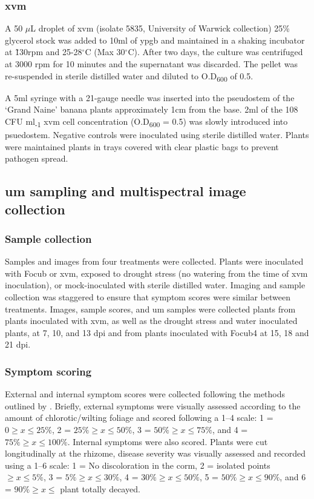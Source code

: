 \subsubsection{\acl{xvm}}
A 50 \(\mu\)L droplet of \acf{xvm} (isolate 5835, University of Warwick collection) 25\% glycerol stock was added to 10ml of \ac{ypgb} and maintained in a shaking incubator at \~ 130rpm and 25-28$^{\circ}$C (Max 30$^{\circ}$C). After two days, the culture was centrifuged at 3000 \ac{rpm} for 10 minutes and the supernatant was discarded. The pellet was re-suspended in sterile distilled water and diluted to O.D\textsubscript{600} of 0.5. 

A 5ml syringe with a 21-gauge needle was inserted into the pseudostem of the ‘Grand Naine’ banana plants approximately 1cm from the base. 2ml of the 108 CFU ml\textsubscript{-1} \ac{xvm} cell concentration (O.D\textsubscript{600} = 0.5) was slowly introduced into psuedostem. Negative controls were inoculated using sterile distilled water. Plants were maintained plants in trays covered with clear plastic bags to prevent pathogen spread. 

\subsection{\Acl{um} sampling and multispectral image collection}
\subsubsection{Sample collection}
Samples and images from four treatments were collected. Plants were inoculated with \ac{Focub} or \ac{xvm}, exposed to drought stress (no watering from the time of \ac{xvm} inoculation), or mock-inoculated with sterile distilled water. Imaging and sample collection was staggered to ensure that symptom scores were similar between treatments. Images, sample scores, and \ac{um} samples were collected plants from plants inoculated with \ac{xvm}, as well as the drought stress and water inoculated plants, at 7, 10, and 13 \ac{dpi} and from plants inoculated with \ac{Focub4} at 15, 18 and 21 \ac{dpi}. 

\subsubsection{Symptom scoring}
External and internal symptom scores were collected following the methods outlined by \textcite{Garcia-Bastidas2019}. Briefly, external symptoms were visually assessed according to the amount of chlorotic/wilting foliage and scored following a 1–4 scale: 1 =  $0\ge x \leq25\%$, 2 = $25\%\ge x \leq50\%$, 3 = $50\%\ge x \leq75\%$, and 4 = $75\%\ge x \leq100\%$. Internal symptoms were also scored. Plants were cut longitudinally at the rhizome, disease severity was visually assessed and recorded using a 1–6 scale:  1 = No discoloration in the corm, 2 = isolated points $\ge x \leq5\%$, 3 = $5\%\ge x \leq30\%$, 4 = $30\%\ge x \leq50\%$, 5 = $50\%\ge x \leq90\%$, and 6 = $90\%\ge x \leq$ plant totally decayed. 

